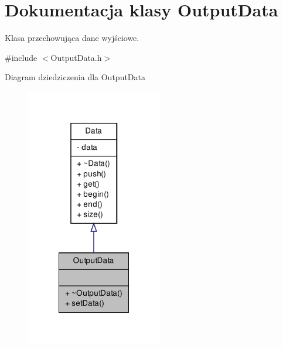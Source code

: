 \hypertarget{class_output_data}{\section{\-Dokumentacja klasy \-Output\-Data}
\label{class_output_data}
}


\-Klasa przechowująca dane wyjściowe.  




{\ttfamily \#include $<$\-Output\-Data.\-h$>$}



\-Diagram dziedziczenia dla \-Output\-Data\nopagebreak
\begin{figure}[H]
\begin{center}
\leavevmode
\includegraphics[width=168pt]{class_output_data__inherit__graph}
\end{center}
\end{figure}


